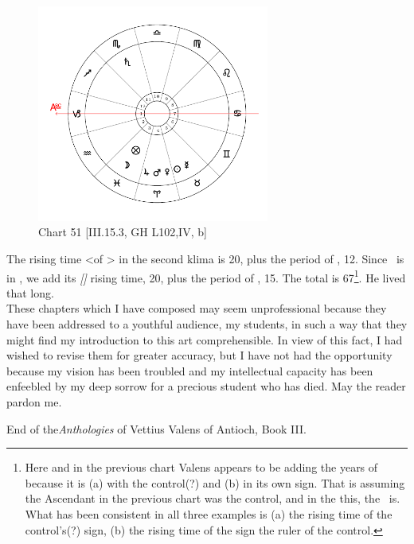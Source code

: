 \clearpage
\begin{figure}
\centering
\vspace{-28pt}
\includegraphics[width=0.68\textwidth]{charts/3_15_3}
\caption{Chart 51 [III.15.3, GH L102,IV, b]}
\label{fig:chart51}
\end{figure} 

The rising time <of \Pisces> in the second klima is 20, plus the period of \Jupiter, 12. Since \Jupiter\, is in \Aries, we add its \textsl{[\Aries]} rising time, 20, plus the period of \Mars, 15. The total is 67\footnote{Here and in the previous chart Valens appears to be adding the years of \Mars\, because it is (a) with the control(?) and (b) in its own sign. That is assuming the Ascendant in the previous chart was the control, and in the this, the \Moon\, is. What has been consistent in all three examples is (a) the rising time of the control's(?) sign, (b) the rising time of the sign the ruler of the control.}. He lived that long. \\
\newline
\newline
These chapters which I have composed may seem unprofessional because they have been addressed to a youthful audience, my students, in such a way that they might find my introduction to this art comprehensible. In view of this fact, I had wished to revise them for greater accuracy, but I have not had the opportunity because my vision has been troubled and my intellectual capacity has been enfeebled by my deep sorrow for a precious student who has died. May the reader pardon me.

End of the\textit{Anthologies} of Vettius Valens of Antioch, Book III.

\newpage